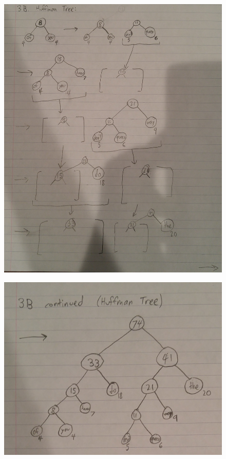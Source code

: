 \begin{solution}
\noindent
\begin{figure}[H]
\centering
\includegraphics[scale=0.1]{../3b1.jpg}
\end{figure}
\noindent
\noindent
\begin{figure}[H]
\centering
\includegraphics[scale=0.1]{../3b2.jpg}
\end{figure}
\noindent
{}
\end{solution}


